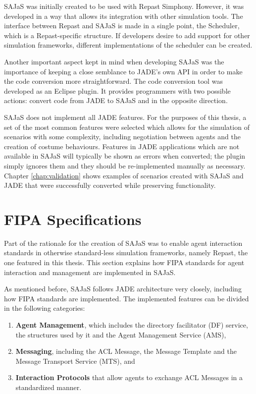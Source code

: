 SAJaS was initially created to be used with Repast Simphony. However, it was developed in a way that allows its integration with other simulation tools. The interface between Repast and SAJaS is made in a single point, the Scheduler, which is a Repast-specific structure. If developers desire to add support for other simulation frameworks, different implementations of the scheduler can be created.

Another important aspect kept in mind when developing SAJaS was the importance of keeping a close semblance to JADE's own API in order to make the code  conversion more straightforward. The code conversion tool was developed as an Eclipse plugin. It provides programmers with two possible actions: convert code from JADE to SAJaS and in the opposite direction.

SAJaS does not implement all JADE features. For the purposes of this thesis, a set of the most common features were selected which allows for the simulation of scenarios with some complexity, including negotiation between agents and the creation of costume behaviours. Features in JADE applications which are not available in SAJaS will typically be shown as errors when converted; the plugin simply ignores them and they should be re-implemented manually as necessary. Chapter \ref{chap:validation} shows examples of scenarios created with SAJaS and JADE that were successfully converted while preserving functionality.

\section{FIPA Specifications}
\label{sec:solution-fipa}

Part of the rationale for the creation of SAJaS was to enable agent interaction standards in otherwise standard-less simulation frameworks, namely Repast, the one featured in this thesis. This section explains how FIPA standards for agent interaction and management are implemented in SAJaS.

As mentioned before, SAJaS follows JADE architecture very closely, including how FIPA standards are implemented. The implemented features can be divided in the following categories:

\begin{enumerate}
  \item \textbf{Agent Management}, which includes the directory facilitator (DF) service, the structures used by it and the Agent Management Service (AMS),
  \item \textbf{Messaging}, including the ACL Message, the Message Template and the Message Transport Service (MTS), and
  \item \textbf{Interaction Protocols} that allow agents to exchange ACL Messages in a standardized manner.
\end{enumerate}

